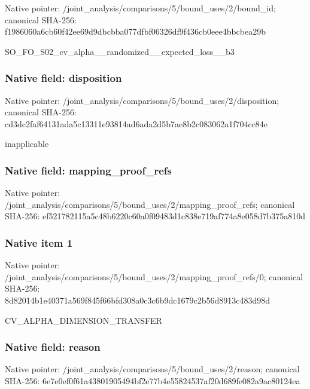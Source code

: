 \documentclass[10pt,a4paper]{article}
\begin{document}
Native pointer: /joint\_analysis/comparis\allowbreak{}ons/5/bound\_uses/2/bound\allowbreak{}\_id; canonical SHA-256: f1986060a6cb60f42ee69d9d\allowbreak{}bcbba077dfbf06326df9f436\allowbreak{}cb0eee4bbcbea29b


SO\_FO\_S02\_cv\_alpha\_\_rand\allowbreak{}omized\_\_expected\_loss\_\_b\allowbreak{}3


\subsubsection{Native field: disposition}


Native pointer: /joint\_analysis/comparis\allowbreak{}ons/5/bound\_uses/2/dispo\allowbreak{}sition; canonical SHA-256: cd3dc2faf64131ada5c13311\allowbreak{}e93814ad6ada2d5b7ae8b2c0\allowbreak{}83062a1f704cc84e


inapplicable


\subsubsection{Native field: mapping\_proof\_refs}


Native pointer: /joint\_analysis/comparis\allowbreak{}ons/5/bound\_uses/2/mappi\allowbreak{}ng\_proof\_refs; canonical SHA-256: ef521782115a5c48b6220c60\allowbreak{}a0f09483d1c838e719af774a\allowbreak{}8e058d7b375a810d



\subsubsection{Native item 1}


Native pointer: /joint\_analysis/comparis\allowbreak{}ons/5/bound\_uses/2/mappi\allowbreak{}ng\_proof\_refs/0; canonical SHA-256: 8d82014b1e40371a569f845f\allowbreak{}66bfd308a0c3c6b9dc1679c2\allowbreak{}b56d8913c483d98d


CV\_ALPHA\_DIMENSION\_TRANSFER


\subsubsection{Native field: reason}


Native pointer: /joint\_analysis/comparis\allowbreak{}ons/5/bound\_uses/2/reaso\allowbreak{}n; canonical SHA-256: 6e7e0ef0f61a43801905494b\allowbreak{}f2e77b4e55824537af20d689\allowbreak{}fe082a9ac80124ea
\end{document}
